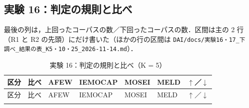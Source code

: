 \subsection*{実験 16：判定の規則と比べ}
最後の列は，上回ったコーパスの数／下回ったコーパスの数．区間は主の 2 行（R1 と R2 の先頭）にだけ書いた（ほかの行の区間は \texttt{DAI/docs/実験16・17\_下調べ\_結果の表\_K5・10・25\_2026-11-14.md}）．\par
\begin{longtable}{>{\raggedright}p{0.75cm}>{\raggedright}p{5.6cm}>{\raggedright}p{2.05cm}>{\raggedright}p{2.05cm}>{\raggedright}p{2.05cm}>{\raggedright}p{2.05cm}p{0.75cm}}
\caption{実験 16：判定の規則と比べ（K = 5）}\\
\toprule
区分 & 比べ & AFEW & IEMOCAP & MOSEI & MELD & $\uparrow$／$\downarrow$ \\
\midrule
\endfirsthead
\toprule
区分 & 比べ & AFEW & IEMOCAP & MOSEI & MELD & $\uparrow$／$\downarrow$ \\
\midrule
\endhead
\bottomrule
\endfoot


\end{longtable}
